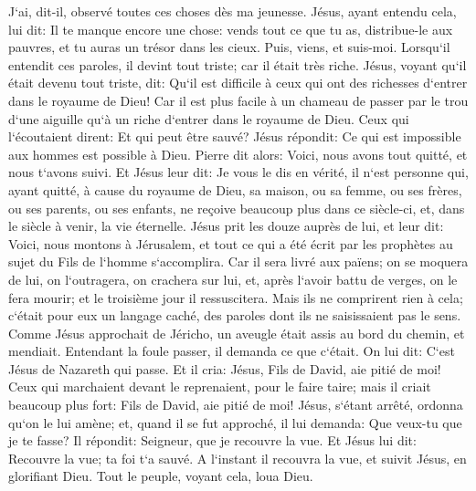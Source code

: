\verse J`ai, dit-il, observé toutes ces choses dès ma jeunesse. 
\verse Jésus, ayant entendu cela, lui dit: Il te manque encore une chose: vends tout ce que tu as, distribue-le aux pauvres, et tu auras un trésor dans les cieux. Puis, viens, et suis-moi. 
\verse Lorsqu`il entendit ces paroles, il devint tout triste; car il était très riche. 
\verse Jésus, voyant qu`il était devenu tout triste, dit: Qu`il est difficile à ceux qui ont des richesses d`entrer dans le royaume de Dieu! 
\verse Car il est plus facile à un chameau de passer par le trou d`une aiguille qu`à un riche d`entrer dans le royaume de Dieu. 
\verse Ceux qui l`écoutaient dirent: Et qui peut être sauvé? 
\verse Jésus répondit: Ce qui est impossible aux hommes est possible à Dieu. 
\verse Pierre dit alors: Voici, nous avons tout quitté, et nous t`avons suivi. 
\verse Et Jésus leur dit: Je vous le dis en vérité, il n`est personne qui, ayant quitté, à cause du royaume de Dieu, sa maison, ou sa femme, ou ses frères, ou ses parents, ou ses enfants, 
\verse ne reçoive beaucoup plus dans ce siècle-ci, et, dans le siècle à venir, la vie éternelle. 
\verse Jésus prit les douze auprès de lui, et leur dit: Voici, nous montons à Jérusalem, et tout ce qui a été écrit par les prophètes au sujet du Fils de l`homme s`accomplira. 
\verse Car il sera livré aux païens; on se moquera de lui, on l`outragera, on crachera sur lui, 
\verse et, après l`avoir battu de verges, on le fera mourir; et le troisième jour il ressuscitera. 
\verse Mais ils ne comprirent rien à cela; c`était pour eux un langage caché, des paroles dont ils ne saisissaient pas le sens. 
\verse Comme Jésus approchait de Jéricho, un aveugle était assis au bord du chemin, et mendiait. 
\verse Entendant la foule passer, il demanda ce que c`était. 
\verse On lui dit: C`est Jésus de Nazareth qui passe. 
\verse Et il cria: Jésus, Fils de David, aie pitié de moi! 
\verse Ceux qui marchaient devant le reprenaient, pour le faire taire; mais il criait beaucoup plus fort: Fils de David, aie pitié de moi! 
\verse Jésus, s`étant arrêté, ordonna qu`on le lui amène; et, quand il se fut approché, 
\verse il lui demanda: Que veux-tu que je te fasse? Il répondit: Seigneur, que je recouvre la vue. 
\verse Et Jésus lui dit: Recouvre la vue; ta foi t`a sauvé. 
\verse A l`instant il recouvra la vue, et suivit Jésus, en glorifiant Dieu. Tout le peuple, voyant cela, loua Dieu. 

